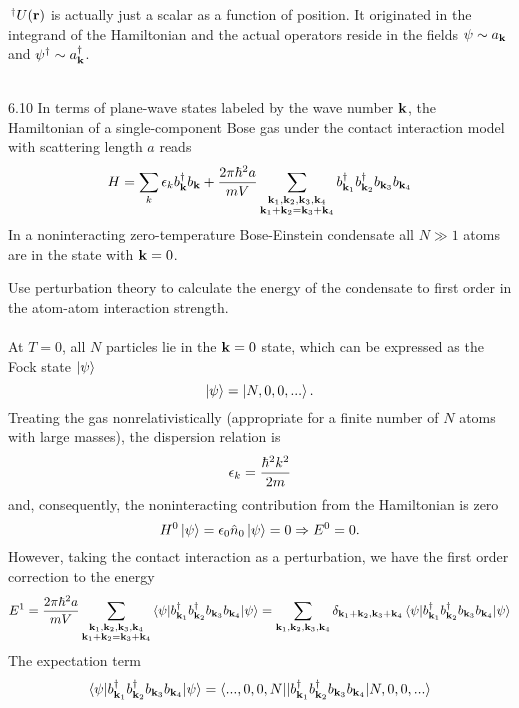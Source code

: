 \documentclass[10pt,letterpaper]{article}
\begin{document}
\\ \\
$\ ^\dag$$U(\vect r)$ is actually just a scalar as a function of position. It originated in the integrand of the Hamiltonian 
and the actual operators reside in the fields $\psi\sim a_{\vect k}$ and $\psi^\dag\sim a^\dag_{\vect k}$.
\\ \\
\item[6.10]	 
In terms of plane-wave states labeled by the wave number $\vect k$, the Hamiltonian of a single-component Bose gas
under the contact interaction model with scattering length $a$ reads
\[
	H = \sum_k \epsilon_k b_{\mathbf{k}}^\dag b_{\mathbf{k}}+\frac{2\pi\hbar^2 a}{mV}
	\sum_{\substack{\mathbf{k}_1,\mathbf{k}_2,\mathbf{k}_3,\mathbf{k}_4\\ \mathbf{k}_1+\mathbf{k}_2 = \mathbf{k}_3+\mathbf{k}_4}}
	b_{\mathbf{k}_1}^\dag b_{\mathbf{k}_2}^\dag b_{\mathbf{k}_3}b_{\mathbf{k}_4}
\]
In a noninteracting zero-temperature Bose-Einstein condensate all $N\gg 1$ atoms are in the state with $\vect k =0$.
\benum
\item
Use perturbation theory to calculate the energy of the condensate to first order in the atom-atom interaction strength.
\\ \\
At $T=0$, all $N$ particles lie in the $\vect k=0$ state, which can be expressed as the Fock state $\ket\psi$
\[
	\ket\psi = \ket{N,0,0,...}.
\]
Treating the gas nonrelativistically (appropriate for a finite number of $N$ atoms with large masses), the dispersion 
relation is
\[
	\epsilon_k = \frac{\hbar^2 k^2}{2m}
\]
and, consequently, the noninteracting contribution from the Hamiltonian is zero
\[
	H^0\ket\psi = \epsilon_0 \hat n_0 \ket\psi = 0\Rightarrow E^0 = 0.
\]
However, taking the contact interaction as a perturbation, we have the first order correction to the energy
\[
	E^1 = \frac{2\pi\hbar^2 a}{mV}
	\sum_{\substack{\mathbf{k}_1,\mathbf{k}_2,\mathbf{k}_3,\mathbf{k}_4\\ \mathbf{k}_1+\mathbf{k}_2 = \mathbf{k}_3+\mathbf{k}_4}}
	 \braket{\psi|b_{\mathbf{k}_1}^\dag b_{\mathbf{k}_2}^\dag b_{\mathbf{k}_3}b_{\mathbf{k}_4}|\psi}=
	 \sum_{\mathbf{k}_1,\mathbf{k}_2,\mathbf{k}_3,\mathbf{k}_4}\delta_{\mathbf{k}_1+\mathbf{k}_2,\mathbf{k}_3+\mathbf{k}_4}
	 \braket{\psi|b_{\mathbf{k}_1}^\dag b_{\mathbf{k}_2}^\dag b_{\mathbf{k}_3}b_{\mathbf{k}_4}|\psi}
\]
The expectation term
\[
	 \braket{\psi|b_{\mathbf{k}_1}^\dag b_{\mathbf{k}_2}^\dag b_{\mathbf{k}_3}b_{\mathbf{k}_4}|\psi}
	 =  \braket{...,0,0,N||b_{\mathbf{k}_1}^\dag b_{\mathbf{k}_2}^\dag b_{\mathbf{k}_3}b_{\mathbf{k}_4}|N,0,0,...}
\]$$
\end{document}
